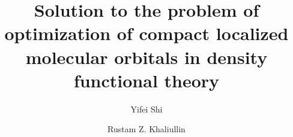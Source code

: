 \documentclass[aps,prl,twocolumn,reprint,amsmath,amssymb]{revtex4-1}
\begin{document}
\newcommand{\Ang}{\ensuremath{\mathring{\text{A}}}}
\newcommand{\ltwid}{\mathrel{\raise.3ex\hbox{$<$\kern-.75em\lower1ex\hbox{$\sim$}}}}
\newcommand{\gtwid}{\mathrel{\raise.3ex\hbox{$>$\kern-.75em\lower1ex\hbox{$\sim$}}}}
\newcommand{\bra}{\langle}
\newcommand{\ket}{\rangle}
\newcommand{\sill}{\psi}
\newcommand{\trace}{{\rm Tr}}
\newcommand{\ntilde}{\tilde{n}}
\newcommand{\stilde}{\tilde{s}}
\newcommand{\atilde}{\tilde{\alpha}}
\newcommand{\new}{\color{red}}
\newcommand{\old}{\color{black}}
\newcommand{\bea}{\begin{eqnarray}}
\newcommand{\eea}{\end{eqnarray}}
\newcommand{\br}{\ensuremath{\mathbf{r}}}
\def\nn{\nonumber\\}



\title{Solution to the problem of optimization of compact localized molecular orbitals in density functional theory}

\author{Yifei Shi}
\author{Rustam Z. Khaliullin}

\end{document}
